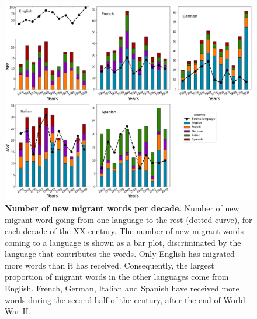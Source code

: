\documentclass[10pt,letterpaper]{article} %
\begin{document}
\begin{figure}[!h] %
	\begin{adjustwidth}{-1.2in}{0in}
	\includegraphics[scale=.35]{NW_A.png}
	\caption{{\bf Number of new migrant words per decade.} 
Number of new migrant word going from one language to the rest (dotted
curve), for each decade of the XX century. The number of 
new migrant words coming to a language is shown as a bar plot, discriminated
by the language that contributes the words. 
Only English has
migrated more words than it has received.
Consequently, the largest proportion of migrant words in the other languages
come from English. French, German, Italian and Spanish have received more words
during the second half of the century, after the end of World War II.	
}
\label{fig.NMW_A}
\end{adjustwidth}
\end{figure} %
\end{document}
